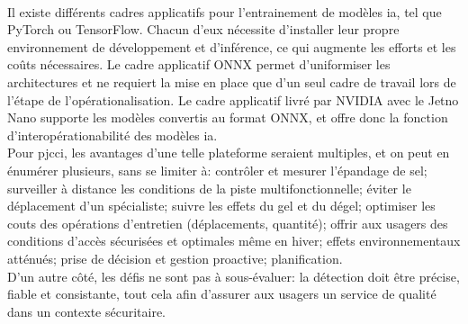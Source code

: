 \vspace{\baselineskip}
\\
\noindent Il existe différents cadres applicatifs pour l'entrainement de modèles \acrshort{ia}, tel que PyTorch ou TensorFlow. Chacun d'eux nécessite d'installer leur propre environnement de développement et d'inférence, ce qui augmente les efforts et les coûts nécessaires. Le cadre applicatif ONNX permet d'uniformiser les architectures et ne requiert la mise en place que d'un seul cadre de travail lors de l'étape de l'opérationalisation. Le cadre applicatif livré par NVIDIA avec le Jetno Nano supporte les modèles convertis au format ONNX, et offre donc la fonction d'interopérationabilité des modèles \acrshort{ia}. 
\vspace{\baselineskip}
\\
\noindent Pour \acrshort{pjcci}, les avantages d'une telle plateforme seraient multiples, et on peut en énumérer plusieurs, sans se limiter à: contrôler et mesurer l'épandage de sel; surveiller à distance les conditions de la piste multifonctionnelle; éviter le déplacement d'un spécialiste; suivre les effets du gel et du dégel; optimiser les couts des opérations d'entretien (déplacements, quantité); offrir aux usagers des conditions d'accès sécurisées et optimales même en hiver; effets environnementaux atténués; prise de décision et gestion proactive; planification.
\vspace{\baselineskip}
\\
\noindent D'un autre côté, les défis ne sont pas à sous-évaluer: la détection doit être précise, fiable et consistante, tout cela afin d'assurer aux usagers un service de qualité dans un contexte sécuritaire.